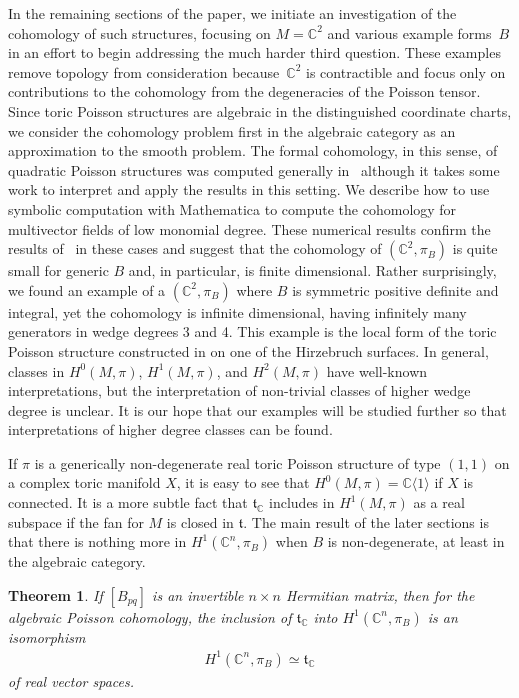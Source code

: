 \documentclass[pdftex]{sigma}
\numberwithin{equation}{section}
\newtheorem{Theorem}{Theorem}[section]
\begin{document}
In the remaining sections of the paper, we initiate an investigation of the cohomology of such structures, focusing on $M={\mathbb C}^2$ and various example forms~$B$ in an ef\/fort to begin addressing the much harder third question. These examples remove topology from consideration because~${\mathbb C}^2$ is contractible and focus only on contributions to the cohomology from the degeneracies of the Poisson tensor. Since toric Poisson structures are algebraic in the distinguished coordinate charts, we consider the cohomology problem f\/irst in the algebraic category as an approximation to the smooth problem. The formal cohomology, in this sense, of quadratic Poisson structures was computed generally in~\cite{Monnier} although it takes some work to interpret and apply the results in this setting. We describe how to use symbolic computation with Mathematica to compute the cohomology for multivector f\/ields of low monomial degree. These numerical results conf\/irm the results of~\cite{Monnier} in these cases and suggest that the cohomology of $({\mathbb C}^2,\pi_B)$ is quite small for generic $B$ and, in particular, is f\/inite dimensional. Rather surprisingly, we found an example of a $({\mathbb C}^2,\pi_B)$ where $B$ is symmetric positive def\/inite and integral, yet the cohomology is inf\/inite dimensional, having inf\/initely many generators in wedge degrees 3 and 4. This example is the local form of the toric Poisson structure constructed in \cite{Caine} on one of the Hirzebruch surfaces. In general, classes in $H^0(M,\pi)$, $H^1(M,\pi)$, and $H^2(M,\pi)$ have well-known interpretations, but the interpretation of non-trivial classes of higher wedge degree is unclear. It is our hope that our examples will be studied further so that interpretations of higher degree classes can be found.

If $\pi$ is a generically non-degenerate real toric Poisson structure of type $(1,1)$ on a complex toric manifold $X$, it is easy to see that $H^0(M,\pi)={\mathbb C}\langle 1\rangle$ if $X$ is connected. It is a more subtle fact that ${\mathfrak t}_{\mathbb C}$ includes in $H^1(M,\pi)$ as a real subspace if the fan for $M$ is closed in ${\mathfrak t}$. The main result of the later sections is that there is nothing more in $H^1({\mathbb C}^n,\pi_B)$ when $B$ is non-degenerate, at least in the algebraic category.

\begin{Theorem}\label{3rd_main_theorem}
If $[B_{pq}]$ is an invertible $n\times n$ Hermitian matrix, then for the algebraic Poisson cohomology, the inclusion of ${\mathfrak t}_{\mathbb C}$ into $H^1({\mathbb C}^n,\pi_B)$ is an isomorphism
\begin{gather*}
H^1({\mathbb C}^n,\pi_B)\simeq {\mathfrak t}_{\mathbb C}
\end{gather*}
of real vector spaces.
\end{Theorem}
\end{document}
